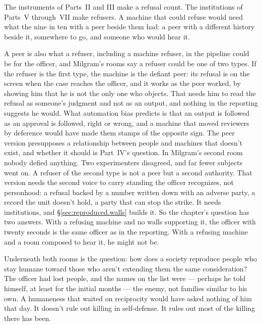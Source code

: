 The instruments of Parts~II and III make a refusal count. The institutions of Parts~V through~VII make refusers. A machine that could refuse would need what the nine in ten with a peer beside them had: a peer with a different history beside it, somewhere to go, and someone who would hear it.

A peer is also what a refuser, including a machine refuser, in the pipeline could be for the officer, and Milgram's rooms say a refuser could be one of two types. If the refuser is the first type, the machine is the defiant peer: its refusal is on the screen when the case reaches the officer, and it works as the peer worked, by showing him that he is not the only one who objects. That needs him to read the refusal as someone's judgment and not as an output, and nothing in the reporting suggests he would. What automation bias predicts is that an output is followed as an approval is followed, right or wrong, and a machine that moved reviewers by deference would have made them stamps of the opposite sign. The peer version presupposes a relationship between people and machines that doesn't exist, and whether it should is Part~IV's question. In Milgram's second room nobody defied anything. Two experimenters disagreed, and far fewer subjects went on. A refuser of the second type is not a peer but a second authority. That version needs the second voice to carry standing the officer recognizes, not personhood: a refusal backed by a number written down with an adverse party, a record the unit doesn't hold, a party that can stop the strike. It needs institutions, and \S\ref{sec:reproduced.walls} builds it. So the chapter's question has two answers. With a refusing machine and no walls supporting it, the officer with twenty seconds is the same officer as in the reporting. With a refusing machine and a room composed to hear it, he might not be.

Underneath both rooms is the question: how does a society reproduce people who stay humane toward those who aren't extending them the same consideration? The officer had lost people, and the names on the list were — perhaps he told himself, at least for the initial months — the enemy, not families similar to his own. A humaneness that waited on reciprocity would have asked nothing of him that day. It doesn't rule out killing in self-defense. It rules out most of the killing there has been.
